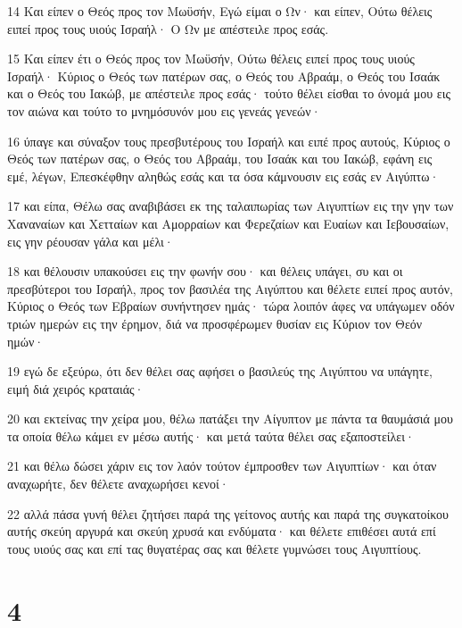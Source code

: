 \par 14 Και είπεν ο Θεός προς τον Μωϋσήν, Εγώ είμαι ο Ων· και είπεν, Ούτω θέλεις ειπεί προς τους υιούς Ισραήλ· Ο Ων με απέστειλε προς εσάς.
\par 15 Και είπεν έτι ο Θεός προς τον Μωϋσήν, Ούτω θέλεις ειπεί προς τους υιούς Ισραήλ· Κύριος ο Θεός των πατέρων σας, ο Θεός του Αβραάμ, ο Θεός του Ισαάκ και ο Θεός του Ιακώβ, με απέστειλε προς εσάς· τούτο θέλει είσθαι το όνομά μου εις τον αιώνα και τούτο το μνημόσυνόν μου εις γενεάς γενεών·
\par 16 ύπαγε και σύναξον τους πρεσβυτέρους του Ισραήλ και ειπέ προς αυτούς, Κύριος ο Θεός των πατέρων σας, ο Θεός του Αβραάμ, του Ισαάκ και του Ιακώβ, εφάνη εις εμέ, λέγων, Επεσκέφθην αληθώς εσάς και τα όσα κάμνουσιν εις εσάς εν Αιγύπτω·
\par 17 και είπα, Θέλω σας αναβιβάσει εκ της ταλαιπωρίας των Αιγυπτίων εις την γην των Χαναναίων και Χετταίων και Αμορραίων και Φερεζαίων και Ευαίων και Ιεβουσαίων, εις γην ρέουσαν γάλα και μέλι·
\par 18 και θέλουσιν υπακούσει εις την φωνήν σου· και θέλεις υπάγει, συ και οι πρεσβύτεροι του Ισραήλ, προς τον βασιλέα της Αιγύπτου και θέλετε ειπεί προς αυτόν, Κύριος ο Θεός των Εβραίων συνήντησεν ημάς· τώρα λοιπόν άφες να υπάγωμεν οδόν τριών ημερών εις την έρημον, διά να προσφέρωμεν θυσίαν εις Κύριον τον Θεόν ημών·
\par 19 εγώ δε εξεύρω, ότι δεν θέλει σας αφήσει ο βασιλεύς της Αιγύπτου να υπάγητε, ειμή διά χειρός κραταιάς·
\par 20 και εκτείνας την χείρα μου, θέλω πατάξει την Αίγυπτον με πάντα τα θαυμάσιά μου τα οποία θέλω κάμει εν μέσω αυτής· και μετά ταύτα θέλει σας εξαποστείλει·
\par 21 και θέλω δώσει χάριν εις τον λαόν τούτον έμπροσθεν των Αιγυπτίων· και όταν αναχωρήτε, δεν θέλετε αναχωρήσει κενοί·
\par 22 αλλά πάσα γυνή θέλει ζητήσει παρά της γείτονος αυτής και παρά της συγκατοίκου αυτής σκεύη αργυρά και σκεύη χρυσά και ενδύματα· και θέλετε επιθέσει αυτά επί τους υιούς σας και επί τας θυγατέρας σας και θέλετε γυμνώσει τους Αιγυπτίους.

\chapter{4}

